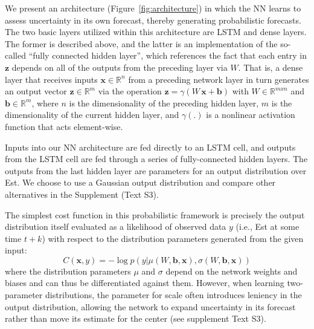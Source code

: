 We present an architecture (Figure~\ref{fig:architecture}) in which the NN learns to assess uncertainty in its own forecast, thereby generating probabilistic forecasts. The two basic layers utilized within this architecture are LSTM and dense layers. The former is described above, and the latter is an implementation of the so-called ``fully connected hidden layer'', which references the fact that each entry in $\mathbf{z}$ depends on all of the outputs from the preceding layer via $W$. That is, a dense layer that receives inputs $\mathbf{x} \in \mathbb{R}^n$ from a preceding network layer in turn generates an output vector $\mathbf{z} \in \mathbb{R}^m$ via the operation $\mathbf{z} = \gamma(W\,\mathbf{x} + \mathbf{b})$ with $W \in \mathbb{R}^{mxn}$ and $\mathbf{b} \in \mathbb{R}^m$, where $n$ is the dimensionality of the preceding hidden layer, $m$ is the dimensionality of the current hidden layer, and $\gamma(.)$ is a nonlinear activation function that acts element-wise. 

Inputs into our NN architecture are fed directly to an LSTM cell, and outputs from the LSTM cell are fed through a series of fully-connected hidden layers. The outputs from the last hidden layer are parameters for an output distribution over Est. We choose to use a Gaussian output distribution and compare other alternatives in the Supplement (Text S3). 

The simplest cost function in this probabilistic framework is precisely the output distribution itself evaluated as a likelihood of observed data $y$ (i.e., Est at some time $t+k$) with respect to the distribution parameters generated from the given input:
\begin{equation}
C(\mathbf{x}, y) = -\log p\left( y \vert \mu(W, \mathbf{b}, \mathbf{x}), \sigma(W, \mathbf{b}, \mathbf{x})\right) \label{eq:output}
\end{equation}
where the distribution parameters $\mu$ and $\sigma$ depend on the network weights and biases and can thus be differentiated against them. However, when learning two-parameter distributions, the parameter for scale often introduces leniency in the output distribution, allowing the network to expand uncertainty in its forecast rather than move its estimate for the center (see supplement Text S3). 

